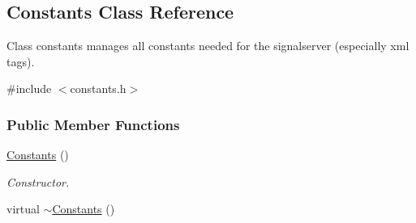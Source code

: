 \hypertarget{class_constants}{
\subsection{Constants Class Reference}
\label{class_constants}
}


Class constants manages all constants needed for the signalserver (especially xml tags).  


{\ttfamily \#include $<$constants.h$>$}\subsubsection*{Public Member Functions}
\begin{DoxyCompactItemize}
\item 
\hyperlink{class_constants_af395b3c1d6f0577f4880a21a257aa1db}{Constants} ()
\begin{DoxyCompactList}\small\item\em Constructor. \item\end{DoxyCompactList}\item 
\hypertarget{class_constants_a2b04b5b24eacf1edb21b003109f88d8b}{
virtual \hyperlink{class_constants_a2b04b5b24eacf1edb21b003109f88d8b}{$\sim$Constants} ()}
\label{class_constants_a2b04b5b24eacf1edb21b003109f88d8b}


\end{DoxyCompactItemize}

